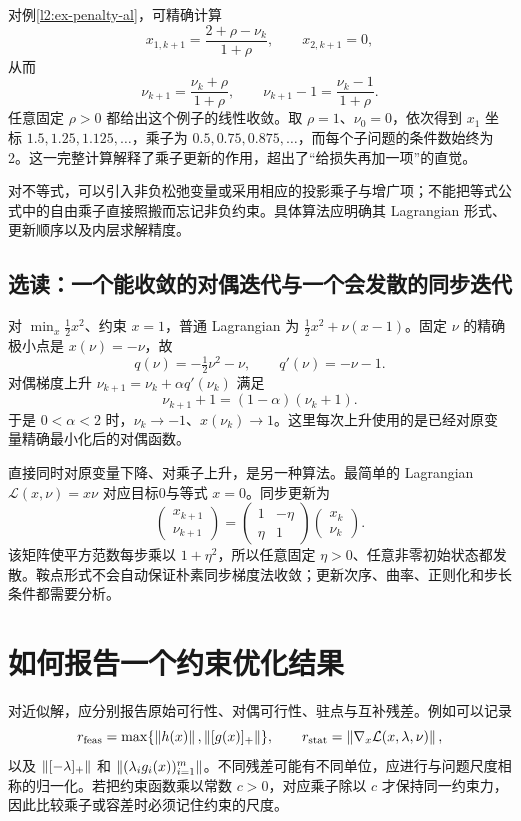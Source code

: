对例\ref{l2:ex-penalty-al}，可精确计算
\[
 x_{1,k+1}=\frac{2+\rho-\nu_k}{1+\rho},\qquad x_{2,k+1}=0,
\]
从而
\[
 \nu_{k+1}=\frac{\nu_k+\rho}{1+\rho},
 \qquad\nu_{k+1}-1=\frac{\nu_k-1}{1+\rho}.
\]
任意固定 $\rho>0$ 都给出这个例子的线性收敛。取 $\rho=1$、$\nu_0=0$，依次得到 $x_1$ 坐标 $1.5,1.25,1.125,\ldots$，乘子为 $0.5,0.75,0.875,\ldots$，而每个子问题的条件数始终为2。这一完整计算解释了乘子更新的作用，超出了“给损失再加一项”的直觉。

对不等式，可以引入非负松弛变量或采用相应的投影乘子与增广项；不能把等式公式中的自由乘子直接照搬而忘记非负约束。具体算法应明确其 Lagrangian 形式、更新顺序以及内层求解精度。

\subsection{选读：一个能收敛的对偶迭代与一个会发散的同步迭代}

对 $\min_x\tfrac12x^2$、约束 $x=1$，普通 Lagrangian 为 $\tfrac12x^2+\nu(x-1)$。固定 $\nu$ 的精确极小点是 $x(\nu)=-\nu$，故
\[
 q(\nu)=-\tfrac12\nu^2-\nu,\qquad q'(\nu)=-\nu-1.
\]
对偶梯度上升 $\nu_{k+1}=\nu_k+\alpha q'(\nu_k)$ 满足
\[
 \nu_{k+1}+1=(1-\alpha)(\nu_k+1).
\]
于是 $0<\alpha<2$ 时，$\nu_k\to-1$、$x(\nu_k)\to1$。这里每次上升使用的是已经对原变量精确最小化后的对偶函数。

直接同时对原变量下降、对乘子上升，是另一种算法。最简单的 Lagrangian $\mathcal L(x,\nu)=x\nu$ 对应目标0与等式 $x=0$。同步更新为
\[
 \begin{pmatrix}x_{k+1}\\\nu_{k+1}\end{pmatrix}
 =\begin{pmatrix}1&-\eta\\\eta&1\end{pmatrix}
  \begin{pmatrix}x_k\\\nu_k\end{pmatrix}.
\]
该矩阵使平方范数每步乘以 $1+\eta^2$，所以任意固定 $\eta>0$、任意非零初始状态都发散。鞍点形式不会自动保证朴素同步梯度法收敛；更新次序、曲率、正则化和步长条件都需要分析。

\section{如何报告一个约束优化结果}
\label{l2:diagnostics}

对近似解，应分别报告原始可行性、对偶可行性、驻点与互补残差。例如可以记录
\[
 r_{\rm feas}=\max\{\left\lVert h(x)\right\rVert,\left\lVert[g(x)]_+\right\rVert\},\qquad
 r_{\rm stat}=\left\lVert\nabla_x\mathcal L(x,\lambda,\nu)\right\rVert,
\]
以及 $\left\lVert[-\lambda]_+\right\rVert$ 和 $\left\lVert(\lambda_i g_i(x))_{i=1}^m\right\rVert$。不同残差可能有不同单位，应进行与问题尺度相称的归一化。若把约束函数乘以常数 $c>0$，对应乘子除以 $c$ 才保持同一约束力，因此比较乘子或容差时必须记住约束的尺度。


